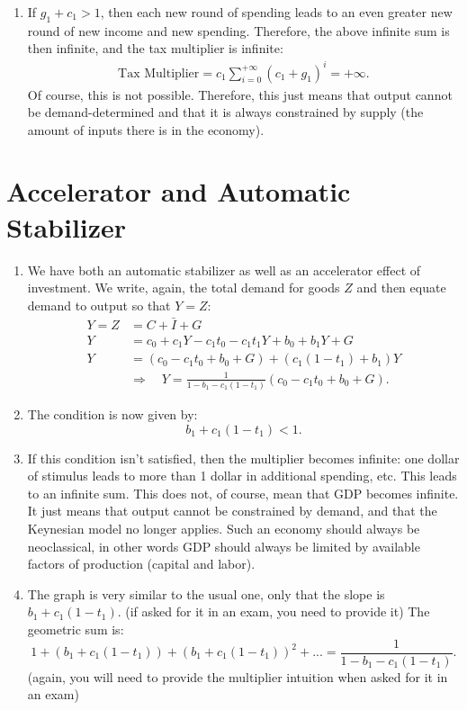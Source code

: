 \documentclass[]{book}
\providecommand{\tightlist}{%
  \setlength{\itemsep}{0pt}\setlength{\parskip}{0pt}}
\theoremstyle{definition}
\theoremstyle{definition}
\theoremstyle{definition}
\theoremstyle{remark}
\begin{document}
\begin{enumerate}
\def\labelenumi{\arabic{enumi}.}
\setcounter{enumi}{4}
\tightlist
\item
  If \(g_1+c_1>1\), then each new round of spending leads to an even
  greater new round of new income and new spending. Therefore, the above
  infinite sum is then infinite, and the tax multiplier is infinite: \[
  \begin{aligned}
  \text{Tax Multiplier} =c_1 \sum_{i=0}^{+\infty}(c_1+g_1)^i = +\infty.
  \end{aligned}
  \] Of course, this is not possible. Therefore, this just means that
  output cannot be demand-determined and that it is always constrained
  by supply (the amount of inputs there is in the economy).
\end{enumerate}

\section{Accelerator and Automatic
Stabilizer}\label{accelerator-and-automatic-stabilizer-1}

\begin{enumerate}
\def\labelenumi{\arabic{enumi}.}
\item
  We have both an automatic stabilizer as well as an accelerator effect
  of investment. We write, again, the total demand for goods \(Z\) and
  then equate demand to output so that \(Y=Z\): \[
  \begin{aligned}
  Y=Z &=C+\bar{I}+G\\
  Y   &=c_{0}+c_{1} Y - c_1 t_0 - c_1 t_1 Y+ b_0+ b_{1}Y + G\\
  Y   &=\left(c_{0}-c_{1}t_0+b_{0}+G\right)+\left(c_{1}(1-t_1)+b_1\right)Y \\
  & \Rightarrow \quad \boxed{Y=\frac{1}{1-b_{1}-c_{1}(1-t_1)}\left(c_{0}-c_{1}t_0+b_{0}+G\right)}.
  \end{aligned}
  \]
\item
  The condition is now given by: \[b_1 + c_1(1-t_1)<1.\]
\item
  If this condition isn't satisfied, then the multiplier becomes
  infinite: one dollar of stimulus leads to more than 1 dollar in
  additional spending, etc. This leads to an infinite sum. This does
  not, of course, mean that GDP becomes infinite. It just means that
  output cannot be constrained by demand, and that the Keynesian model
  no longer applies. Such an economy should always be neoclassical, in
  other words GDP should always be limited by available factors of
  production (capital and labor).
\item
  The graph is very similar to the usual one, only that the slope is
  \(b_1+c_1(1-t_1)\). (if asked for it in an exam, you need to provide
  it) The geometric sum is:
  \[1+ \left(b_1+c_1(1-t_1)\right) + \left(b_1+c_1(1-t_1)\right)^2 + ... = \frac{1}{1-b_1-c_1(1-t_1)}.\]
  (again, you will need to provide the multiplier intuition when asked
  for it in an exam)
\end{enumerate}
\end{document}

